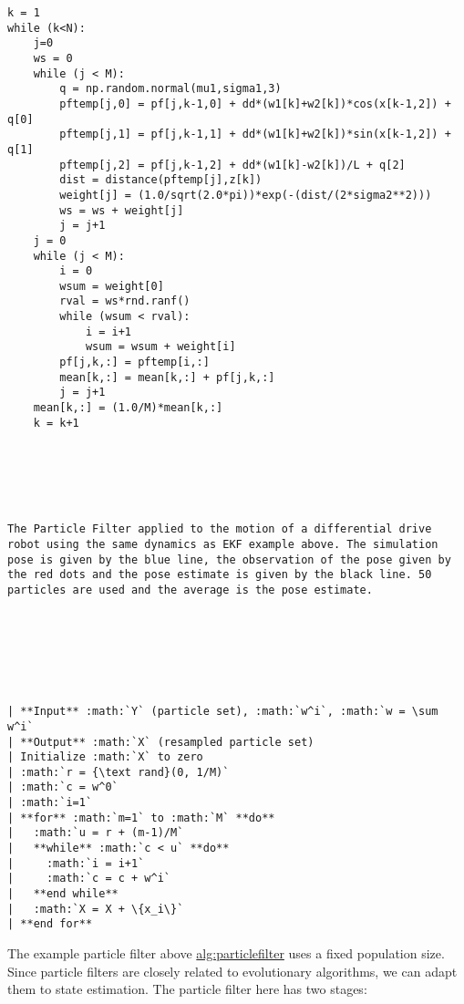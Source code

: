\begin{verbatim}
k = 1
while (k<N):
    j=0
    ws = 0
    while (j < M):
        q = np.random.normal(mu1,sigma1,3)
        pftemp[j,0] = pf[j,k-1,0] + dd*(w1[k]+w2[k])*cos(x[k-1,2]) + q[0]
        pftemp[j,1] = pf[j,k-1,1] + dd*(w1[k]+w2[k])*sin(x[k-1,2]) + q[1]
        pftemp[j,2] = pf[j,k-1,2] + dd*(w1[k]-w2[k])/L + q[2]
        dist = distance(pftemp[j],z[k])
        weight[j] = (1.0/sqrt(2.0*pi))*exp(-(dist/(2*sigma2**2)))
        ws = ws + weight[j]
        j = j+1
    j = 0
    while (j < M):
        i = 0
        wsum = weight[0]
        rval = ws*rnd.ranf()
        while (wsum < rval):
            i = i+1
            wsum = wsum + weight[i]
        pf[j,k,:] = pftemp[i,:]
        mean[k,:] = mean[k,:] + pf[j,k,:]
        j = j+1
    mean[k,:] = (1.0/M)*mean[k,:]
    k = k+1






The Particle Filter applied to the motion of a differential drive
robot using the same dynamics as EKF example above. The simulation
pose is given by the blue line, the observation of the pose given by
the red dots and the pose estimate is given by the black line. 50
particles are used and the average is the pose estimate.







| **Input** :math:`Y` (particle set), :math:`w^i`, :math:`w = \sum w^i`
| **Output** :math:`X` (resampled particle set)
| Initialize :math:`X` to zero
| :math:`r = {\text rand}(0, 1/M)`
| :math:`c = w^0`
| :math:`i=1`
| **for** :math:`m=1` to :math:`M` **do**
|   :math:`u = r + (m-1)/M`
|   **while** :math:`c < u` **do**
|     :math:`i = i+1`
|     :math:`c = c + w^i`
|   **end while**
|   :math:`X = X + \{x_i\}`
| **end for**
\end{verbatim}

The example particle filter above
\href{..\%20topic::\%20\%20Particle\%20Filter.\%20:cite:\%60thrun2005probabilistic\%60}{alg:particlefilter}
uses a fixed population size. Since particle filters are closely related
to evolutionary algorithms, we can adapt them to state estimation. The
particle filter here has two stages:

